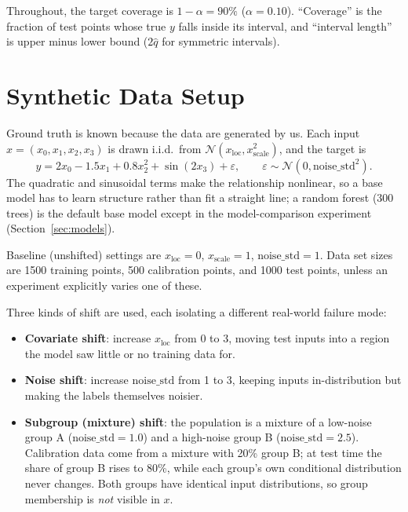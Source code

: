 \documentclass[11pt]{article}
\begin{document}
Throughout, the target coverage is $1-\alpha = 90\%$ ($\alpha = 0.10$). ``Coverage''
is the fraction of test points whose true $y$ falls inside its interval, and
``interval length'' is upper minus lower bound ($2\hat q$ for symmetric intervals).

\section{Synthetic Data Setup}
\label{sec:data}

Ground truth is known because the data are generated by us. Each input
$x = (x_0, x_1, x_2, x_3)$ is drawn i.i.d.\ from $\mathcal N(x_{\text{loc}},
x_{\text{scale}}^2)$, and the target is
\[
  y = 2x_0 - 1.5x_1 + 0.8x_2^2 + \sin(2x_3) + \varepsilon, \qquad
  \varepsilon \sim \mathcal N(0, \text{noise\_std}^2).
\]
The quadratic and sinusoidal terms make the relationship nonlinear, so a base model
has to learn structure rather than fit a straight line; a random forest (300 trees)
is the default base model except in the model-comparison experiment
(Section~\ref{sec:models}).

Baseline (unshifted) settings are $x_{\text{loc}} = 0$, $x_{\text{scale}} = 1$,
$\text{noise\_std} = 1$. Data set sizes are 1500 training points, 500 calibration
points, and 1000 test points, unless an experiment explicitly varies one of these.

Three kinds of shift are used, each isolating a different real-world failure mode:

\begin{itemize}
  \item \textbf{Covariate shift}: increase $x_{\text{loc}}$ from 0 to 3, moving test
    inputs into a region the model saw little or no training data for.
  \item \textbf{Noise shift}: increase $\text{noise\_std}$ from 1 to 3, keeping
    inputs in-distribution but making the labels themselves noisier.
  \item \textbf{Subgroup (mixture) shift}: the population is a mixture of a
    low-noise group A ($\text{noise\_std}=1.0$) and a high-noise group B
    ($\text{noise\_std}=2.5$). Calibration data come from a mixture with 20\% group B;
    at test time the share of group B rises to 80\%, while each group's own
    conditional distribution never changes. Both groups have identical input
    distributions, so group membership is \emph{not} visible in $x$.
\end{itemize}
\end{document}
